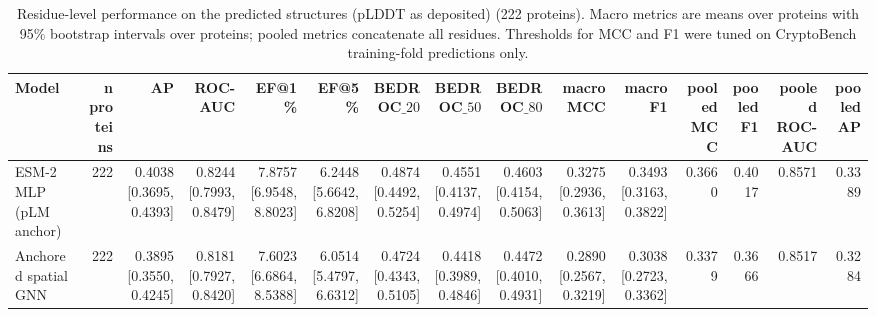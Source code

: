 \begin{table}[t]
\centering
\small
\caption{Residue-level performance on the predicted structures (pLDDT as deposited) (222 proteins). Macro metrics are means over proteins with 95\% bootstrap intervals over proteins; pooled metrics concatenate all residues. Thresholds for MCC and F1 were tuned on CryptoBench training-fold predictions only.}
\label{tab:table_absolute}
\begin{tabular}{lrrrrrrrrrrrrrr}
\toprule
Model & n proteins & AP & ROC-AUC & EF@1\% & EF@5\% & BEDROC$\_{20}$ & BEDROC$\_{50}$ & BEDROC$\_{80}$ & macro MCC & macro F1 & pooled MCC & pooled F1 & pooled ROC-AUC & pooled AP \\
\midrule
ESM-2 MLP (pLM anchor) & 222 & 0.4038 [0.3695, 0.4393] & 0.8244 [0.7993, 0.8479] & 7.8757 [6.9548, 8.8023] & 6.2448 [5.6642, 6.8208] & 0.4874 [0.4492, 0.5254] & 0.4551 [0.4137, 0.4974] & 0.4603 [0.4154, 0.5063] & 0.3275 [0.2936, 0.3613] & 0.3493 [0.3163, 0.3822] & 0.3660 & 0.4017 & 0.8571 & 0.3389 \\
Anchored spatial GNN & 222 & 0.3895 [0.3550, 0.4245] & 0.8181 [0.7927, 0.8420] & 7.6023 [6.6864, 8.5388] & 6.0514 [5.4797, 6.6312] & 0.4724 [0.4343, 0.5105] & 0.4418 [0.3989, 0.4846] & 0.4472 [0.4010, 0.4931] & 0.2890 [0.2567, 0.3219] & 0.3038 [0.2723, 0.3362] & 0.3379 & 0.3666 & 0.8517 & 0.3284 \\
\bottomrule
\end{tabular}
\end{table}
